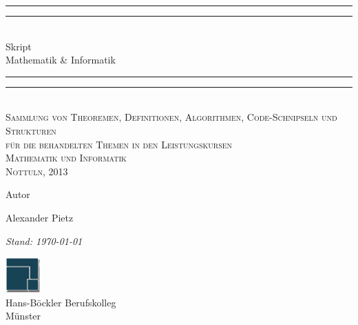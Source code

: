 \documentclass[a4paper,10pt,DIV9, BCOR12mm, oneside,openright,openbib]{scrreprt}
\theoremstyle{definition}
\theoremstyle{plain}
\begin{document}
\pagestyle{empty}
\begingroup
\centering
\vspace*{\baselineskip}

\rule{\textwidth}{1.6pt}\vspace*{-\baselineskip}\vspace*{2pt}
\rule{\textwidth}{0.4pt}\\[\baselineskip]

{\LARGE Skript\\[0.3\baselineskip] Mathematik \& Informatik } \\[0.5\baselineskip] 

\rule{\textwidth}{0.4pt}\vspace*{-\baselineskip}\vspace{3.2pt} 
\rule{\textwidth}{1.6pt}\\[\baselineskip]

\scshape 
Sammlung von Theoremen, Definitionen, Algorithmen, Code-Schnipseln und Strukturen \\ 
für die behandelten Themen in den Leistungskursen \\ Mathematik und Informatik\\[\baselineskip] 
Nottuln, 2013\par

\vspace*{3\baselineskip}

Autor\\[\baselineskip]
{\Large Alexander Pietz\par}
{\itshape Stand: \today \par}

\vfill 

\includegraphics[width=50px,height=51px]{../logo.png} \\[0.3\baselineskip]
{\large Hans-Böckler Berufskolleg\\ Münster}\par

\endgroup
\newpage

\pagestyle{scrheadings}
\renewcommand{\headfont}{%
  \normalfont\sffamily
}
\ohead{\rightmark}
\chead{}
\ihead{\leftmark}
\ofoot{\pagemark}
\cfoot{}
\setheadtopline{1pt}
\setheadsepline{.2pt}
\setfootsepline{.4pt}
\end{document}
